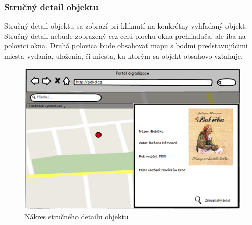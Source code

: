 \documentclass[
  print, %
  table,   %
  lof,     %
  nolot,     %
]{fithesis3}
\begin{document}
\subsubsection{Stručný detail objektu}
Stručný detail objektu sa zobrazí pri kliknutí na konkrétny vyhľadaný objekt. Stručný detail nebude zobrazený cez celú plochu okna prehliadača, ale iba na polovici okna. Druhá polovica bude obsahovať mapu s bodmi predstavujúcimi miesta vydania, uloženia, či miesta, ku ktorým sa objekt obsahovo vzťahuje. 
\clearpage
\begin{figure}[H]
	\centering
	\includegraphics[width=\textwidth]{fithesis/mockup/detail-small.png}	
	\caption{Nákres stručného detailu objektu}
	\label{mockup-detail-small}
\end{figure}
\end{document}

